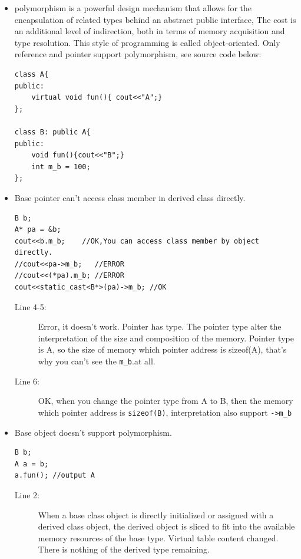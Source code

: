 \documentclass[a4paper,11pt,twoside]{book}
\begin{document}
\begin{itemize}
	\item polymorphism is a powerful design mechanism that allows for the encapsulation of related types behind an abstract public interface, The cost is an additional level of indirection, both in terms of memory acquisition and type resolution. This style of programming is called object-oriented. Only reference and pointer support polymorphism, see source code below:

\begin{lstlisting}[numbers=none]
class A{
public:
	virtual void fun(){ cout<<"A";}
};
	
class B: public A{
public:
	void fun(){cout<<"B";}
	int m_b = 100;
};
\end{lstlisting}

	\item Base pointer can't access class member in derived class directly.
	
\begin{lstlisting}
B b;
A* pa = &b;
cout<<b.m_b;    //OK,You can access class member by object directly.
//cout<<pa->m_b;   //ERROR 
//cout<<(*pa).m_b; //ERROR
cout<<static_cast<B*>(pa)->m_b; //OK
\end{lstlisting}
\begin{description}
	\item[Line 4-5:] Error, it doesn't work. Pointer has type. The pointer type alter the interpretation of the size and composition of the memory. Pointer type is A, so the size of memory which pointer address is sizeof(A), that's why you can't see the \texttt{m\_b}.at all.
	\item[Line 6:] OK, when you change the pointer type from A to B, then the memory which pointer address is \texttt{sizeof(B)}, interpretation also support \texttt{->m\_b} 
\end{description}

\item Base object doesn't support polymorphism.
\begin{lstlisting}
B b;
A a = b;
a.fun(); //output A
\end{lstlisting}
\begin{description}
	\item[Line 2:] When a base class object is directly initialized or assigned with a derived class object, the derived object is sliced to fit into the available memory resources of the base type. Virtual table content changed. There is nothing of the derived type remaining. 
	

\end{description}
\end{itemize}
\end{document}
